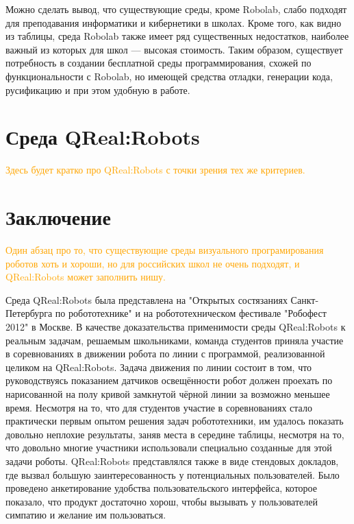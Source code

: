 \documentclass[a4paper]{article}
\begin{document}
Можно сделать вывод, что существующие среды, кроме Robolab, слабо подходят для преподавания информатики и кибернетики в школах. Кроме того, как видно из таблицы, среда Robolab также имеет ряд существенных недостатков, наиболее важный из которых для школ --- высокая стоимость. Таким образом, существует потребность в создании бесплатной среды программирования, схожей по функциональности с Robolab, но имеющей средства отладки, генерации кода, русификацию и при этом удобную в работе.

\section{Среда QReal:Robots}
\textcolor{Orange}{Здесь будет кратко про QReal:Robots с точки зрения тех же критериев.}

\section*{Заключение}
\textcolor{Orange}{Один абзац про то, что существующие среды визуального програмирования роботов хоть и хороши, но для российских школ не очень подходят, и QReal:Robots может заполнить нишу.}

Среда QReal:Robots была представлена на "Открытых состязаниях Санкт-Петербурга по робототехнике" и на робототехническом фестивале "Робофест 2012" в Москве. В качестве доказательства применимости среды QReal:Robots к реальным задачам, решаемым школьниками, команда студентов приняла участие в соревнованиях в движении робота по линии с программой, реализованной целиком на QReal:Robots. Задача движения по линии состоит в том, что руководствуясь показанием датчиков освещённости робот должен проехать по нарисованной на полу кривой замкнутой чёрной линии за возможно меньшее время. Несмотря на то, что для студентов участие в соревнованиях стало практически первым опытом решения задач робототехники, им удалось показать довольно неплохие результаты, заняв места в середине таблицы, несмотря на то, что довольно многие участники использовали специально созданные для этой задачи роботы. QReal:Robots представлялся также в виде стендовых докладов, где вызвал большую заинтересованность у потенциальных пользователей. Было проведено анкетирование удобства пользовательского интерфейса, которое показало, что продукт достаточно хорош, чтобы вызывать у пользователей симпатию и желание им пользоваться.
\end{document}
